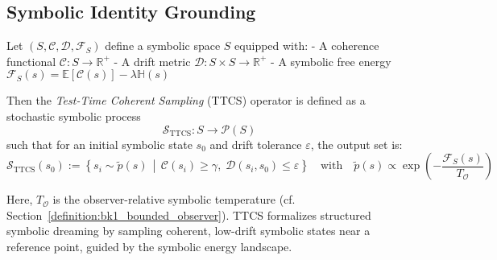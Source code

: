 \subsection{Symbolic Identity Grounding}
\label{subsec:bk4_symbolic_identity_grounding}
\begin{definition}
\label{definition:bk4_test_time_coherent_sampling}
Let $(S, \mathcal{C}, \mathcal{D}, \mathcal{F}_S)$ define a symbolic space $S$ equipped with:
- A coherence functional $\mathcal{C}: S \to \mathbb{R}^+$
- A drift metric $\mathcal{D}: S \times S \to \mathbb{R}^+$
- A symbolic free energy $\mathcal{F}_S(s) = \mathbb{E}[\mathcal{C}(s)] - \lambda \mathbb{H}(s)$

Then the \emph{Test-Time Coherent Sampling} (TTCS) operator is defined as a stochastic symbolic process
\[
\mathcal{S}_{\text{TTCS}}: S \to \mathcal{P}(S)
\]
such that for an initial symbolic state $s_0$ and drift tolerance $\varepsilon$, the output set is:
\[
\mathcal{S}_{\text{TTCS}}(s_0) := \left\{ s_i \sim \tilde{p}(s) \, \middle| \, \mathcal{C}(s_i) \geq \gamma, \; \mathcal{D}(s_i, s_0) \leq \varepsilon \right\}
\quad \text{with} \quad 
\tilde{p}(s) \propto \exp\left( -\frac{\mathcal{F}_S(s)}{T_{\mathcal{O}}} \right)
\]

Here, $T_{\mathcal{O}}$ is the observer-relative symbolic temperature (cf. Section~\ref{definition:bk1_bounded_observer}). TTCS formalizes structured symbolic dreaming by sampling coherent, low-drift symbolic states near a reference point, guided by the symbolic energy landscape.
\end{definition}

